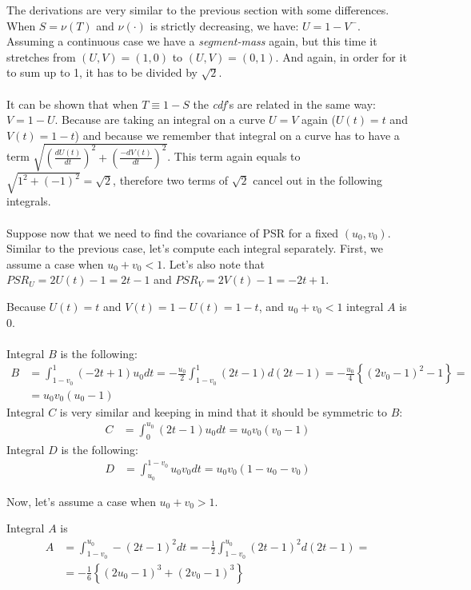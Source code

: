 \documentclass[]{article}
\begin{document}
The derivations are very similar to the previous section with some differences. When $S = \nu( T)$ and $\nu(\cdot)$ is strictly decreasing, we have: $U = 1-V^-$. Assuming a continuous case we have a \emph{segment-mass} again, but this time it stretches from $(U,V) = (1,0)$ to $(U,V) = (0,1)$. And again, in order for it to sum up to 1, it has to be divided by $\sqrt{2}$.\\
~\\
It can be shown that when $T\equiv 1-S$ the \emph{cdf}'s are related in the same way: $V = 1-U$. Because are taking an integral on a curve $U=V$ again ($U(t) = t$ and $V(t)=1-t$) and because we remember that integral on a curve has to have a term $\sqrt{\left(\frac{dU(t)}{dt}\right)^2 + \left(\frac{-dV(t)}{dt}\right)^2}$. This term again equals to $\sqrt{1^2 + (-1)^2} = \sqrt{2}$, therefore two terms of $\sqrt{2}$ cancel out in the following integrals.\\
~\\
Suppose now that we need to find the covariance of PSR for a fixed $(u_0, v_0)$. Similar to the previous case, let's compute each integral separately. First, we assume a case when $u_0 + v_0 < 1$. Let's also note that $PSR_U = 2U(t) - 1 = 2t - 1$ and $PSR_V = 2V(t) - 1 = -2t + 1$.

Because $U(t) = t$ and $V(t)=1 - U(t) = 1 - t$, and $u_0 + v_0 < 1$ integral $A$ is 0.\\
~\\
Integral $B$ is the following: 
	$$
	\begin{aligned}
    B &= \int_{1 - v_0}^1 (-2t + 1)u_0 dt = -\frac{u_0}{2}\int_{1 - v_0}^1 (2t - 1) d(2t - 1)= -\frac{u_0}{4}\left\{  (2v_0 - 1)^2 -1\right\} = \\
    &=u_0v_0(u_0 - 1)
	\end{aligned}
	$$
Integral $C$ is very similar and keeping in mind that it should be symmetric to $B$:
	$$
	\begin{aligned}
    C &=\int_{0}^{u_0} (2t - 1)u_0 dt  = u_0v_0(v_0 - 1)
	\end{aligned}
	$$
Integral $D$ is the following: 
	$$
	\begin{aligned}
    D &= \int_{u_0}^{1-v_0} u_0v_0 dt =u_0v_0(1 - u_0 - v_0)
	\end{aligned}
	$$

Now, let's assume a case when $u_0 + v_0 > 1$. 

Integral $A$ is
	$$
	\begin{aligned}
    A &= \int_{1-v_0}^{u_0} -(2t - 1)^2 dt = -\frac{1}{2} \int_{1-v_0}^{u_0} (2t - 1)^2 d(2t-1) = \\
    &= -\frac{1}{6}\left\{  (2u_0 - 1)^3 + (2v_0 - 1)^3 \right\}
	\end{aligned}
	$$
\end{document}

